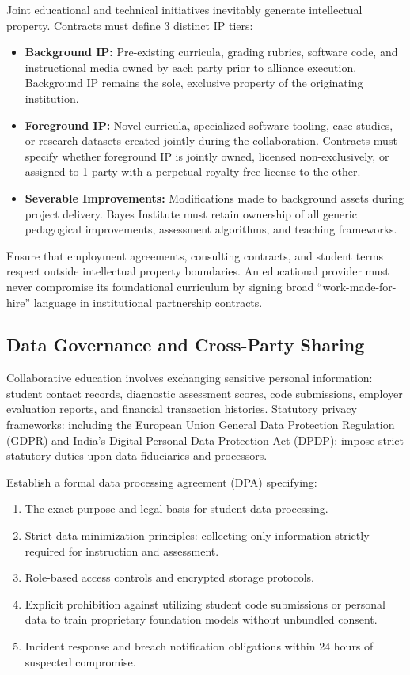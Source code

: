 Joint educational and technical initiatives inevitably generate intellectual property. Contracts must define 3 distinct IP tiers:
\begin{itemize}
\item \textbf{Background IP:} Pre-existing curricula, grading rubrics, software code, and instructional media owned by each party prior to alliance execution. Background IP remains the sole, exclusive property of the originating institution.
\item \textbf{Foreground IP:} Novel curricula, specialized software tooling, case studies, or research datasets created jointly during the collaboration. Contracts must specify whether foreground IP is jointly owned, licensed non-exclusively, or assigned to 1 party with a perpetual royalty-free license to the other.
\item \textbf{Severable Improvements:} Modifications made to background assets during project delivery. Bayes Institute must retain ownership of all generic pedagogical improvements, assessment algorithms, and teaching frameworks.
\end{itemize}
Ensure that employment agreements, consulting contracts, and student terms respect outside intellectual property boundaries. An educational provider must never compromise its foundational curriculum by signing broad ``work-made-for-hire'' language in institutional partnership contracts.

\subsection{Data Governance and Cross-Party Sharing}
\label{sec:data_governance_cross_party}

Collaborative education involves exchanging sensitive personal information: student contact records, diagnostic assessment scores, code submissions, employer evaluation reports, and financial transaction histories. Statutory privacy frameworks: including the European Union General Data Protection Regulation (GDPR) and India's Digital Personal Data Protection Act (DPDP): impose strict statutory duties upon data fiduciaries and processors.

Establish a formal data processing agreement (DPA) specifying:
\begin{enumerate}
\item The exact purpose and legal basis for student data processing.
\item Strict data minimization principles: collecting only information strictly required for instruction and assessment.
\item Role-based access controls and encrypted storage protocols.
\item Explicit prohibition against utilizing student code submissions or personal data to train proprietary foundation models without unbundled consent.
\item Incident response and breach notification obligations within 24 hours of suspected compromise.
\end{enumerate}

